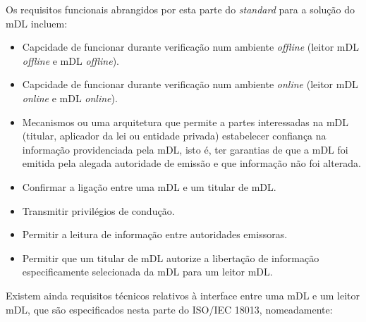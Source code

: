 
Os requisitos funcionais abrangidos por esta parte do \textit{standard} para a
solução do mDL incluem:

\begin{itemize}
	\item Capcidade de funcionar durante verificação num ambiente \textit{offline} (leitor mDL \textit{offline} e mDL \textit{offline}).
	\item Capcidade de funcionar durante verificação num ambiente \textit{online} (leitor mDL \textit{online} e mDL \textit{online}).
	\item Mecanismos ou uma arquitetura que permite a partes
	interessadas na mDL (titular, aplicador da lei ou entidade privada)
	estabelecer confiança na informação providenciada pela mDL, isto é, ter
	garantias de que a mDL foi emitida pela alegada autoridade de emissão e que
	informação não foi alterada.
	\item Confirmar a ligação entre uma mDL e um titular de mDL.
	\item Transmitir privilégios de condução.
	\item Permitir a leitura de informação entre autoridades emissoras.
	\item Permitir que um titular de mDL autorize a libertação de informação especificamente selecionada da mDL para um leitor mDL.
\end{itemize}

Existem ainda requisitos técnicos relativos à interface entre uma mDL e um
leitor mDL, que são especificados nesta parte do ISO/IEC 18013, nomeadamente:


